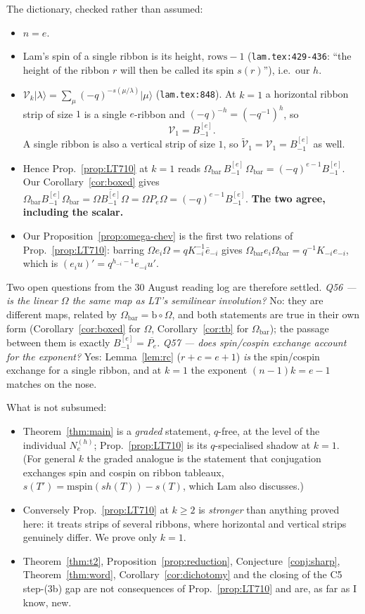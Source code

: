 \documentclass[11pt]{article}
\theoremstyle{plain}
\theoremstyle{definition}
\newcommand{\Om}{\Omega}
\newcommand{\Ombar}{\Om_{\mathrm{bar}}}
\newcommand{\Bm}{B_{-1}^{[e]}}
\newcommand{\N}[1]{N_e^{(#1)}}
\begin{document}
The dictionary, checked rather than assumed:
\begin{itemize}
\item $n=e$.
\item Lam's spin of a single ribbon is its height, $\text{rows}-1$
  (\verb|lam.tex:429-436|: ``the height of the ribbon $r$ will then be called
  its spin $s(r)$''), i.e.\ our $h$.
\item $\mathcal{V}_k\lvert\lambda\rangle=\sum_\mu(-q)^{-s(\mu/\lambda)}
  \lvert\mu\rangle$ (\verb|lam.tex:848|).  At $k=1$ a horizontal ribbon strip
  of size $1$ is a single $e$-ribbon and $(-q)^{-h}=(-q^{-1})^{h}$, so
  \[
     \mathcal{V}_1=\Bm .
  \]
  A single ribbon is also a vertical strip of size $1$, so
  $\widetilde{\mathcal{V}}_1=\mathcal{V}_1=\Bm$ as well.
\item Hence Prop.~\ref{prop:LT710} at $k=1$ reads
  $\Ombar\,\Bm\,\Ombar=(-q)^{e-1}\Bm$.  Our Corollary~\ref{cor:boxed} gives
  $\Ombar\Bm\Ombar=\Om\overline{\Bm}\Om=\Om P_e\Om=(-q)^{e-1}\Bm$.
  \textbf{The two agree, including the scalar.}
\item Our Proposition~\ref{prop:omega-chev} is the first two relations of
  Prop.~\ref{prop:LT710}: barring $\Om e_i\Om=q K_{-i}^{-1}\bar e_{-i}$ gives
  $\Ombar e_i\Ombar=q^{-1}K_{-i}e_{-i}$, which is $(e_iu)'=q^{h_{-i}-1}e_{-i}u'$.
\end{itemize}

Two open questions from the 30 August reading log are therefore settled.
\emph{Q56 --- is the linear $\Om$ the same map as LT's semilinear involution?}
No: they are different maps, related by $\Ombar=\mathrm{b}\circ\Om$, and both
statements are true in their own form (Corollary~\ref{cor:boxed} for $\Om$,
Corollary~\ref{cor:tb} for $\Ombar$); the passage between them is exactly
$\Bm=\overline{P_e}$.  \emph{Q57 --- does spin/cospin exchange account for the
exponent?}  Yes: Lemma~\ref{lem:rc} ($r+c=e+1$) \emph{is} the spin/cospin
exchange for a single ribbon, and at $k=1$ the exponent $(n-1)k=e-1$ matches
on the nose.

What is not subsumed:
\begin{itemize}
\item Theorem~\ref{thm:main} is a \emph{graded} statement, $q$-free, at the
  level of the individual $\N{h}$; Prop.~\ref{prop:LT710} is its
  $q$-specialised shadow at $k=1$.  (For general $k$ the graded analogue is
  the statement that conjugation exchanges spin and cospin on ribbon tableaux,
  $s(T')=\mathrm{mspin}(sh(T))-s(T)$, which Lam also discusses.)
\item Conversely Prop.~\ref{prop:LT710} at $k\ge2$ is \emph{stronger} than
  anything proved here: it treats strips of several ribbons, where horizontal
  and vertical strips genuinely differ.  We prove only $k=1$.
\item Theorem~\ref{thm:t2}, Proposition~\ref{prop:reduction},
  Conjecture~\ref{conj:sharp}, Theorem~\ref{thm:word},
  Corollary~\ref{cor:dichotomy} and the closing of the C5 step-(3b) gap are
  not consequences of Prop.~\ref{prop:LT710} and are, as far as I know, new.
\end{itemize}
\end{document}
